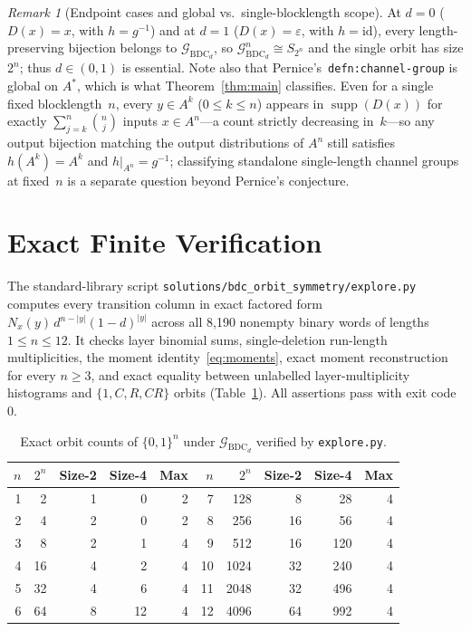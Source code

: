 \documentclass[11pt]{article}
\theoremstyle{plain}
\theoremstyle{definition}
\theoremstyle{remark}
\newtheorem{remark}{Remark}
\DeclareMathOperator{\supp}{supp}
\DeclareMathOperator{\BDC}{BDC}
\begin{document}
\begin{remark}[Endpoint cases and global vs.\ single-blocklength scope]
At $d = 0$ ($D(x) = x$, with $h = g^{-1}$) and at $d = 1$ ($D(x) = \varepsilon$, with $h = \mathrm{id}$), every length-preserving bijection belongs to $\mathcal{G}_{\BDC_d}$, so $\mathcal{G}_{\BDC_d}^n \cong S_{2^n}$ and the single orbit has size $2^n$; thus $d \in (0, 1)$ is essential.
Note also that Pernice's~\texttt{defn:channel-group} is global on $A^*$, which is what Theorem~\ref{thm:main} classifies. Even for a single fixed blocklength~$n$, every $y \in A^k$ ($0 \le k \le n$) appears in $\supp(D(x))$ for exactly $\sum_{j=k}^n \binom{n}{j}$ inputs $x \in A^n$---a count strictly decreasing in~$k$---so any output bijection matching the output distributions of $A^n$ still satisfies $h(A^k) = A^k$ and $h|_{A^n} = g^{-1}$; classifying standalone single-length channel groups at fixed~$n$ is a separate question beyond Pernice's conjecture.
\end{remark}

\section{Exact Finite Verification}

The standard-library script \texttt{solutions/bdc\_orbit\_symmetry/explore.py} computes every transition column in exact factored form $N_x(y)\,d^{n - |y|}(1 - d)^{|y|}$ across all 8{,}190 nonempty binary words of lengths $1 \le n \le 12$. It checks layer binomial sums, single-deletion run-length multiplicities, the moment identity~\eqref{eq:moments}, exact moment reconstruction for every $n \ge 3$, and exact equality between unlabelled layer-multiplicity histograms and $\{1, C, R, CR\}$ orbits (Table~\ref{tab:orbits}). All assertions pass with exit code~$0$.

\begin{table}[h]
\centering
\begin{tabular}{@{}rrrrr@{\hspace{2.2em}}rrrrr@{}}
\toprule
$n$ & $2^n$ & Size-2 & Size-4 & Max & $n$ & $2^n$ & Size-2 & Size-4 & Max \\
\midrule
1 &  2 &  1 &  0 & 2 &  7 &  128 &  8 &  28 & 4 \\
2 &  4 &  2 &  0 & 2 &  8 &  256 & 16 &  56 & 4 \\
3 &  8 &  2 &  1 & 4 &  9 &  512 & 16 & 120 & 4 \\
4 & 16 &  4 &  2 & 4 & 10 & 1024 & 32 & 240 & 4 \\
5 & 32 &  4 &  6 & 4 & 11 & 2048 & 32 & 496 & 4 \\
6 & 64 &  8 & 12 & 4 & 12 & 4096 & 64 & 992 & 4 \\
\bottomrule
\end{tabular}
\caption{Exact orbit counts of $\{0, 1\}^n$ under $\mathcal{G}_{\BDC_d}$ verified by \texttt{explore.py}.}\label{tab:orbits}
\end{table}
\end{document}
